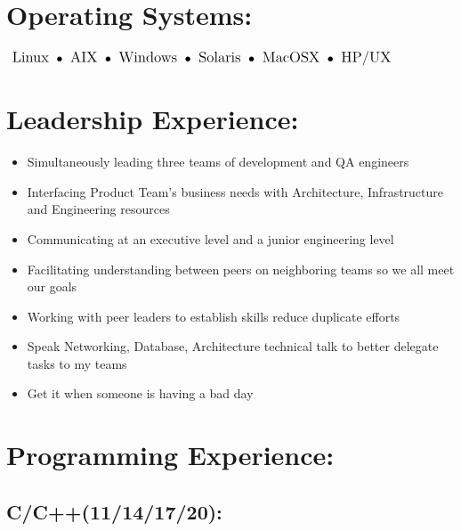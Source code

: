 \documentclass[10pt]{report}
\begin{document}
\section*{Operating Systems:}

\begin{math}
\large
\textrm{ Linux }
\bullet \space \textrm{ AIX } \space
\bullet \space \textrm{ Windows } \space
\bullet \space \textrm{ Solaris } \space
\bullet \space \textrm{ MacOSX } \space
\bullet \space \textrm{ HP/UX }
\end{math}

\pagebreak

\section*{Leadership Experience:}

\begin{itemize}
	\item Simultaneously leading three teams of development and QA engineers 
	\item Interfacing Product Team's business needs with Architecture, Infrastructure and Engineering resources
	\item Communicating at an executive level and a junior engineering level
	\item Facilitating understanding between peers on neighboring teams so we all meet our goals
	\item Working with peer leaders to establish skills reduce duplicate efforts
	\item Speak Networking, Database, Architecture technical talk to better delegate tasks to my teams
	\item Get it when someone is having a bad day
\end{itemize}


\section*{Programming Experience:}

\subsection*{C/C++(11/14/17/20):}
\end{document}
